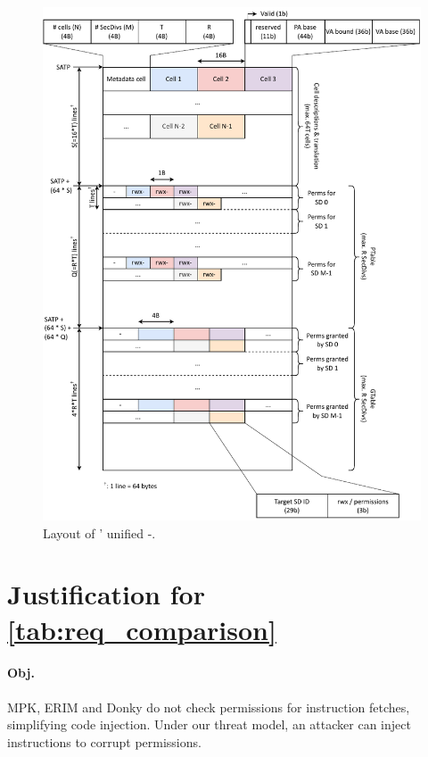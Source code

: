 \begin{figure}
  \centering
  \includegraphics[height=0.95\textheight]{media/seccells/ptable_layout.pdf}
  \caption{Layout of \seccells{}' unified \ptable-\gtable.}
  \label{fig:ptable_layout}
\end{figure}

\section{Justification for \autoref{tab:req_comparison}}
\label{app:justification_table1}

\paragraph{Obj. }
MPK, ERIM and Donky do not check permissions for instruction fetches, 
simplifying code injection.
Under our threat model, an attacker can inject  instructions 
to corrupt permissions.


